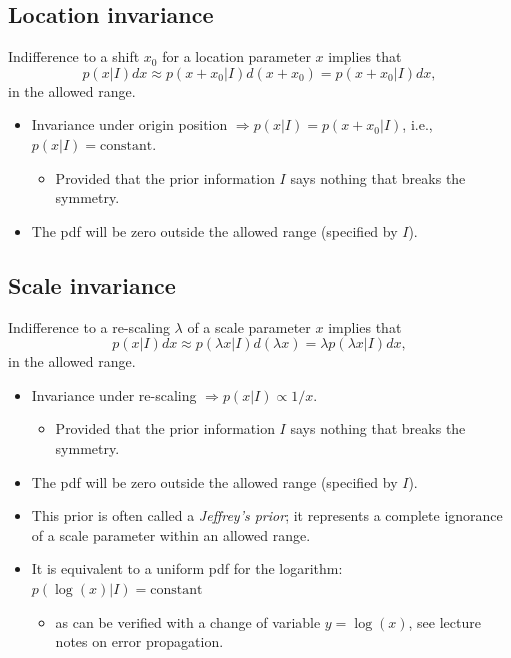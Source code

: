 \documentclass[%
oneside,                 %
final,                   %
10pt]{article}
\begin{document}
\noindent
\subsection{Location invariance}
Indifference to a shift $x_0$ for a location parameter $x$ implies that
\[
p(x|I) dx \approx p(x+ x_0|I) d(x+x_0) =  p(x+ x_0|I) dx,
\]
in the allowed range.

\begin{itemize}
\item Invariance under origin position $\Rightarrow p(x|I) =  p(x+ x_0|I)$, i.e., $p(x|I) = \mathrm{constant}$.
\begin{itemize}

  \item Provided that the prior information $I$ says nothing that breaks the symmetry.

\end{itemize}

\noindent
\item The pdf will be zero outside the allowed range (specified by $I$).
\end{itemize}

\noindent
\subsection{Scale invariance}

Indifference to a re-scaling $\lambda$ of a scale parameter $x$ implies that
\[
p(x|I) dx \approx p(\lambda x|I) d(\lambda x) =  \lambda p(\lambda x|I) dx,
\]
in the allowed range.

\begin{itemize}
\item Invariance under re-scaling $\Rightarrow p(x|I) \propto 1/x$. 
\begin{itemize}

  \item Provided that the prior information $I$ says nothing that breaks the symmetry.

\end{itemize}

\noindent
\item The pdf will be zero outside the allowed range (specified by $I$).

\item This prior is often called a \emph{Jeffrey's prior}; it represents a complete ignorance of a scale parameter within an allowed range.

\item It is equivalent to a uniform pdf for the logarithm: $p(\log(x)|I) = \mathrm{constant}$
\begin{itemize}

  \item as can be verified with a change of variable $y=\log(x)$, see lecture notes on error propagation.
\end{itemize}

\noindent
\end{itemize}
\end{document}
